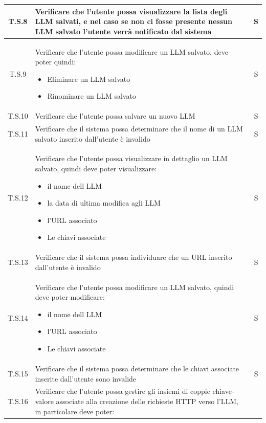 \begin{tabularx}{\textwidth}{|c|X|c|}
    \hline
    \label{ts:ts8} T.S.8 & Verificare che l’utente possa visualizzare la lista degli LLM salvati, e nel caso se non ci fosse presente nessun LLM salvato l’utente verrà notificato dal sistema & S\\
    \hline
    \label{ts:ts9} T.S.9 & 
    Verificare che l’utente possa modificare un LLM salvato, deve poter quindi: 
    \begin{itemize}
        \item Eliminare un LLM salvato
        \item Rinominare un LLM salvato
    \end{itemize} 
    & S\\
    \hline
    \label{ts:ts10} T.S.10 & Verificare che l’utente possa salvare un nuovo LLM & S\\
    \hline
    \label{ts:ts11} T.S.11 & Verificare che il sistema possa determinare che il nome di un LLM salvato inserito dall’utente è invalido & S\\
    \hline
    \label{ts:ts12} T.S.12 & 
    Verificare che l’utente possa visualizzare in dettaglio un LLM salvato, quindi deve poter visualizzare: 
    \begin{itemize}
        \item il nome dell LLM
        \item la data di ultima modifica agli LLM
        \item l’URL associato
        \item Le chiavi associate
    \end{itemize} 
    & S\\
    \hline
    \label{ts:ts13} T.S.13 & Verificare che il sistema possa individuare che un URL inserito dall’utente è invalido & S\\
    \hline
    \label{ts:ts14} T.S.14 & 
    Verificare che l’utente possa modificare un LLM salvato, quindi deve poter modificare:
    \begin{itemize}
        \item il nome dell LLM
        \item l’URL associato
        \item Le chiavi associate
    \end{itemize} 
    & S\\
    \hline
    \label{ts:ts15} T.S.15 & Verificare che il sistema possa determinare che le chiavi associate inserite dall’utente sono invalide & S\\
    \hline
    \label{ts:ts16} T.S.16 & 
    Verificare che l’utente possa gestire gli insiemi di coppie chiave-valore associate alla creazione delle richieste HTTP verso l’LLM, in particolare deve poter: 

\end{tabularx}
